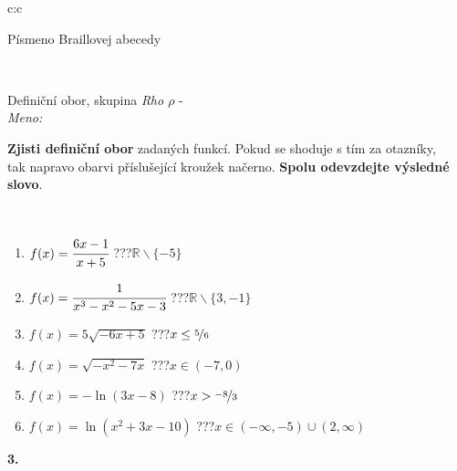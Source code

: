 \documentclass[10pt]{report}
\begin{document}
\begin{tabular}{c:c}
\begin{minipage}[c][104.5mm][t]{0.5\linewidth}
\begin{center}
\begin{minipage}{0.20\linewidth}
\begin{center}
{\small Písmeno Braillovej abecedy}
\end{center}
\end{minipage}
\end{center}
\end{minipage}
\\ \hdashline
\begin{minipage}[c][104.5mm][t]{0.5\linewidth}
\begin{center}
\vspace{7mm}
{\huge Definiční obor, skupina \textit{Rho $\rho$} -}\\[5mm]
\textit{Meno:}\phantom{xxxxxxxxxxxxxxxxxxxxxxxxxxxxxxxxxxxxxxxxxxxxxxxxxxxxxxxxxxxxxxxxx}\\[5mm]
\begin{minipage}{0.95\linewidth}
\textbf{Zjisti definiční obor} zadaných funkcí. Pokud se shoduje s tím za otazníky,\\tak napravo obarvi příslušející kroužek načerno. \textbf{Spolu odevzdejte výsledné slovo}.
\end{minipage}
\\[1mm]
\begin{minipage}{0.79\linewidth}
\begin{center}
\begin{varwidth}{\linewidth}
\begin{enumerate}
\normalsizerrr
\item $f(x)=\cfrac{6x-1}{x+5}$\quad \dotfill\; ???\;\dotfill \quad $\mathbb{R}\smallsetminus\{-5\}$
\item $f(x)=\cfrac{1}{x^3-x^2-5x-3}$\quad \dotfill\; ???\;\dotfill \quad $\mathbb{R}\smallsetminus\{3,-1\}$
\item $f(x)=5\sqrt{-6x+5}$\quad \dotfill\; ???\;\dotfill \quad $x\leq\nicefrac{5}{6}$
\item $f(x)=\sqrt{-x^2-7x}$\quad \dotfill\; ???\;\dotfill \quad $x\in(-7 , 0)$
\item $f(x)=-\ln{(3x-8)}$\quad \dotfill\; ???\;\dotfill \quad $x>\nicefrac{-8}{3}$
\item $f(x)=\ln{(x^2+3x-10)}$\quad \dotfill\; ???\;\dotfill \quad $x\in(-\infty , -5)\cup(2 , \infty)$
\end{enumerate}
\end{varwidth}
\end{center}
\end{minipage}
\begin{minipage}{0.20\linewidth}
\begin{center}
{\Huge\bfseries 3.} \\[2mm]

\end{center}
\end{minipage}
\end{center}
\end{minipage}
\end{tabular}
\end{document}

